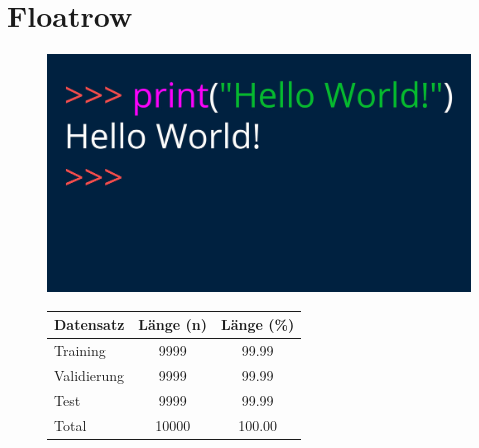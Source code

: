 \section*{Floatrow}
\begin{figure}[H]
    \begin{floatrow}
        {\includegraphics[width=\hsize]{Resources/image.jpeg}
        }
        {\begin{tabular}{@{}lS[table-format=5]S[table-format=3.2]@{}} \toprule
            Datensatz & {Länge (n)} & {Länge (\%)} \\ \midrule %
            Training    & 9999  & 99.99 \\
            Validierung & 9999  & 99.99 \\
            Test        & 9999  & 99.99 \\ \midrule
            Total       & 10000 & 100.00 \\ \bottomrule
        \end{tabular}
        }
    \end{floatrow}
\end{figure}